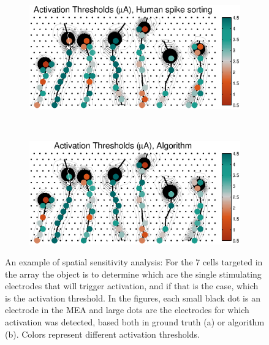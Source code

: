 \documentclass[12pt,letterpaper,fleqn]{article}
\begin{document}
\begin{figure}[ht!]
        \centering
        \begin{subfigure}[b]{0.8\textwidth}
                \includegraphics[width=\textwidth]{HumanActSeveralNeurons.eps}
                \caption{}
        \end{subfigure}%
\\
\begin{subfigure}[b]{0.8\textwidth}
                \includegraphics[width=\textwidth]{AlgActSeveralNeurons.eps}
                \caption{}
        \end{subfigure}
      \caption{An example of spatial sensitivity analysis: For the 7 cells targeted in the array the object is to determine which are the single stimulating electrodes that will trigger activation, and if that is the case, which is the activation threshold. In the figures, each small black dot is an electrode in the MEA and large dots are the electrodes for which activation was detected, based both in ground truth (a) or algorithm (b). Colors represent different activation thresholds.}
      \label{fig:spatialsens}
\end{figure}


\pagebreak

  



    
\end{document}
